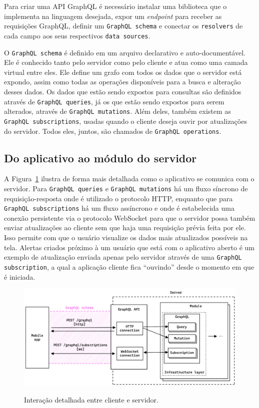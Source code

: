 Para criar uma API GraphQL é necessário instalar uma biblioteca que o implementa na linguagem desejada, expor um \emph{endpoint} para receber as requisições GraphQL, definir um \texttt{GraphQL schema} e conectar os \texttt{resolvers} de cada campo aos seus respectivos \texttt{data sources}.

O \texttt{GraphQL schema} é definido em um arquivo declarativo e auto-documentável. Ele é conhecido tanto pelo servidor como pelo cliente e atua como uma camada virtual entre eles. Ele define um grafo com todos os dados que o servidor está expondo, assim como todas as operações disponíveis para a busca e alteração desses dados. Os dados que estão sendo expostos para consultas são definidos através de \texttt{GraphQL queries}, já os que estão sendo expostos para serem alterados, através de \texttt{GraphQL mutations}. Além deles, também existem as \texttt{GraphQL subscriptions}, usadas quando o cliente deseja ouvir por atualizações do servidor. Todos eles, juntos, são chamados de \texttt{GraphQL operations}.

\subsection{Do aplicativo ao módulo do servidor}

A Figura~\ref{f.system_server_api} ilustra de forma mais detalhada como o aplicativo se comunica com o servidor. Para \texttt{GraphQL queries} e \texttt{GraphQL mutations} há um fluxo síncrono de requisição-resposta onde é utilizado o protocolo HTTP, enquanto que para \texttt{GraphQL subscriptions} há um fluxo assíncrono e onde é estabelecida uma conexão persistente via o protocolo WebSocket para que o servidor possa também enviar atualizações ao cliente sem que haja uma requisição prévia feita por ele. Isso permite com que o usuário visualize os dados mais atualizados possíveis na tela. Alertas criados próximo à um usuário que está com o aplicativo aberto é um exemplo de atualização enviada apenas pelo servidor através de uma \texttt{GraphQL subscription}, a qual a aplicação cliente fica ``ouvindo'' desde o momento em que é iniciada.

\begin{figure}[htbp]
	\caption{\small Interação detalhada entre cliente e servidor.}
	\centering
	\includegraphics[width=\textwidth]{../diagrams/out/system_server_api.png}
	\label{f.system_server_api}
\end{figure}

